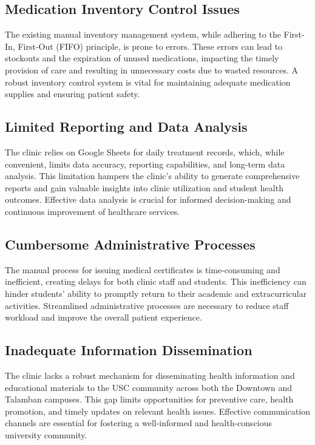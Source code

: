 \subsection{Medication Inventory Control Issues}
The existing manual inventory management system, while adhering to the First-In, First-Out (FIFO) principle, is prone to errors. These errors can lead to stockouts and the expiration of unused medications, impacting the timely provision of care and resulting in unnecessary costs due to wasted resources. A robust inventory control system is vital for maintaining adequate medication supplies and ensuring patient safety.

\subsection{Limited Reporting and Data Analysis}
The clinic relies on Google Sheets for daily treatment records, which, while convenient, limits data accuracy, reporting capabilities, and long-term data analysis. This limitation hampers the clinic's ability to generate comprehensive reports and gain valuable insights into clinic utilization and student health outcomes. Effective data analysis is crucial for informed decision-making and continuous improvement of healthcare services.

\subsection{Cumbersome Administrative Processes}
The manual process for issuing medical certificates is time-consuming and inefficient, creating delays for both clinic staff and students. This inefficiency can hinder students' ability to promptly return to their academic and extracurricular activities. Streamlined administrative processes are necessary to reduce staff workload and improve the overall patient experience.

\subsection{Inadequate Information Dissemination}
The clinic lacks a robust mechanism for disseminating health information and educational materials to the USC community across both the Downtown and Talamban campuses. This gap limits opportunities for preventive care, health promotion, and timely updates on relevant health issues. Effective communication channels are essential for fostering a well-informed and health-conscious university community.

